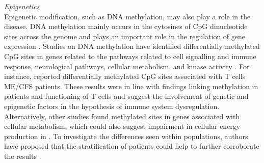\bsni
\textit{Epigenetics}\\
\noindent
Epigenetic modification, such as DNA methylation, may also play a role in the disease.
DNA methylation mainly occurs in the cytosines of CpG dinucleotide sites across the genome and plays an important role in the regulation of gene expression \citep{moore2013DNAMethylation}.
Studies on DNA methylation have identified differentially methylated CpG sites in genes related to the pathways related to cell signalling and immune response, neurological pathways, cellular metabolism, and kinase activity \citep{vegaDNAMethylationModifications2014, trivedi2018IdentificationMyalgic, helliwell2020ChangesDNA}.
For instance, \citet{herrera2018GenomeepigenomeInteractions} reported differentially methylated CpG sites 
associated with T cells ME/CFS patients.
These results were in line with findings linking methylation in \cfs patients and functioning of \cdfour T cells \citep{brenu2014MethylationProfile} and suggest the involvement of genetic and epigenetic factors in the hypothesis of immune system dysregulation.
Alternatively, other studies 
found methylated sites in genes associated with cellular metabolism, which could also suggest impairment in cellular energy production in \cfs \citep{vegaEpigeneticModificationsGlucocorticoid2017}.
To investigate the differences seen within \cfs populations, authors have proposed that the stratification of patients could help to further corroborate the results \citep{vegaIntegrationDNAMethylation2018}.

